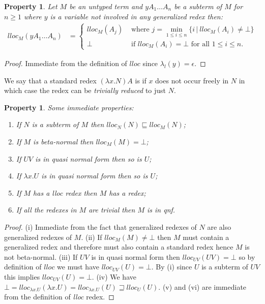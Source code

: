 \documentclass{elsarticle}
\theoremstyle{plain}
\newtheorem{property}[theorem]{Property}
\theoremstyle{definition}
\theoremstyle{remark}
\begin{document}
\begin{property}
\label{prop:qnf_longapply}
    Let $M$ be an untyped term and $y A_1 \ldots A_n$ be a subterm of $M$ for $n\geq1$ where $y$ is a variable not involved in any generalized redex then:
    \begin{align*}
    lloc_M(y A_1 \ldots A_n) &=
        \begin{cases}
         lloc_M (A_j) &\mbox{ where } j = \min_{1\leq i\leq n} \{ i\, | \ lloc_M (A_i) \neq \bot\} \\
         \bot &\mbox{ if } lloc_M(A_i) = \bot \mbox{ for all } 1\leq i\leq n.
        \end{cases}
    \end{align*}
\end{property}
\begin{proof}
    Immediate from the definition of $lloc$ since $\lambda_l(y) = \epsilon$.
\end{proof}

We say that a standard redex $(\lambda x. N) A$ is  if $x$ does not occur freely in $N$ in which case the redex can be \emph{trivially reduced} to just $N$.

\begin{property}
\label{prop:lloc_properties}
Some immediate properties:
\begin{enumerate}[noitemsep,label=(\roman*)]
\item
 If $N$ is a subterm of $M$ then $lloc_N(N) \sqsubseteq lloc_M(N)$;
\item
 If $M$ is beta-normal then $lloc_M(M) = \bot$;
 \item
 If $U V$ is in quasi normal form then so is $U$;
\item
 If $\lambda x . U$ is in quasi normal form then so is $U$;
 \item If $M$ has a \emph{lloc} redex then $M$ has a redex;
 \item If all the redexes in $M$ are trivial then $M$ is in \emph{qnf}.
\end{enumerate}
\end{property}
\begin{proof}
(i) Immediate from the fact that generalized redexes of $N$ are also generalized redexes of $M$. (ii) If $lloc_M(M) \neq \bot$ then $M$ must contain a generalized redex and therefore must also contain a standard redex hence $M$ is not beta-normal.
(iii) If $U V$ is in quasi normal form then $lloc_{UV}(UV) = \bot$ so by definition of $lloc$ we must have $lloc_{UV}(U) = \bot$. By (i) since $U$ is a subterm of $UV$ this implies $lloc_{UV}(U) = \bot$.
(iv) We have $\bot = lloc_{\lambda x . U}(\lambda x . U) = lloc_{\lambda x . U}(U) \sqsupseteq lloc_{U}(U)$.
(v) and (vi) are immediate from the definition of \emph{lloc} redex.
\end{proof}
\end{document}

